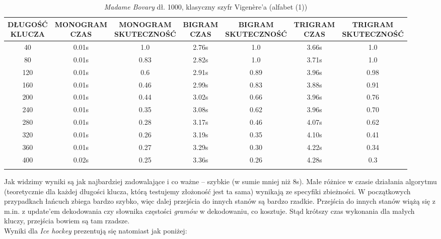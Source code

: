 \documentclass[a4paper]{article}
\theoremstyle{defn}
\theoremstyle{theorem}
\theoremstyle{lemma}
\theoremstyle{cor}
\theoremstyle{fact}
\begin{document}
\begin{center}\begin{small}\begin{longtable}{|c|c|c|c|c|c|c|}
\hline \makecell{DŁUGOŚĆ\\KLUCZA} &  \makecell{MONOGRAM\\CZAS} & \makecell{MONOGRAM\\SKUTECZNOŚĆ} & \makecell{BIGRAM\\CZAS} &  \makecell{BIGRAM\\SKUTECZNOŚĆ} & \makecell{TRIGRAM\\CZAS} & \makecell{TRIGRAM\\SKUTECZNOŚĆ}\\ \hline
40 & 0.01s & 1.0 & 2.76s & 1.0 & 3.66s & 1.0 \\ \hline
80 & 0.01s & 0.83 & 2.82s & 1.0 & 3.71s & 1.0 \\ \hline
120 & 0.01s & 0.6 & 2.91s & 0.89 & 3.96s & 0.98 \\ \hline
160 & 0.01s & 0.46 & 2.99s & 0.83 & 3.88s & 0.91 \\ \hline
200 & 0.01s & 0.44 & 3.02s & 0.66 & 3.96s & 0.76 \\ \hline
240 & 0.01s & 0.35 & 3.08s & 0.62 & 3.96s & 0.70 \\ \hline
280 & 0.01s & 0.28 & 3.17s & 0.46 & 4.07s & 0.62 \\ \hline
320 & 0.01s & 0.26 & 3.19s & 0.35 & 4.10s & 0.41 \\ \hline
360 & 0.01s & 0.27 & 3.29s & 0.30 & 4.22s & 0.34 \\ \hline
400 & 0.02s & 0.25 & 3.36s & 0.26 & 4.28s & 0.3 \\ \hline
\caption{\textit{Madame Bovary} dł. 1000, klasyczny szyfr Vigenère'a (alfabet (1))}
\end{longtable}\end{small}\end{center}
Jak widzimy wyniki są jak najbardziej zadowalające i co ważne – szybkie (w sumie mniej niż 8s). Małe różnice w czasie działania algorytmu (teoretycznie dla każdej długości klucza, którą testujemy złożoność jest ta sama) wynikają ze specyfiki zbieżności. W początkowych przypadkach łańcuch zbiega bardzo szybko, więc dalej przejścia do innych stanów są bardzo rzadkie. Przejścia do innych stanów wiążą się z m.in. z update'em dekodowania czy słownika częstości \textit{gramów} w dekodowaniu, co kosztuje. Stąd krótszy czas wykonania dla małych kluczy, przejścia bowiem są tam rzadsze.\\
Wyniki dla \textit{Ice hockey} prezentują się natomiast jak poniżej:
\end{document}

